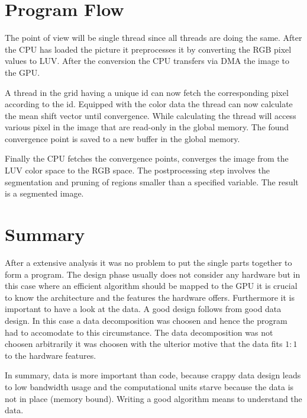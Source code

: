 \section{Program Flow} %
\label{sec:program_flow}

The point of view will be single thread since all threads are doing the same. 
After the \gls{CPU} has loaded the picture it preprocesses it by converting
the \gls{RGB} pixel values to \gls{LUV}. After the conversion the \gls{CPU}
transfers via \gls{DMA} the image to the \gls{GPU}.

A thread in the grid having a unique id can now fetch the corresponding pixel
according to the id. Equipped with the color data the thread can now calculate
the mean shift vector until convergence. While calculating the thread will 
access various pixel in the image that are read-only in the global memory. The 
found convergence point is saved to a new buffer in the global memory.

Finally the \gls{CPU} fetches the convergence points, converges the image from 
the \gls{LUV} color space to the \gls{RGB} space. The postprocessing step
involves the segmentation and pruning of regions smaller than a specified 
variable. The result is a segmented image. 


\section{Summary} %
\label{sec:summary}
After a extensive analysis it was no problem to put the single parts together
to form a program. The design phase usually does not consider any hardware but
in this case where an efficient algorithm should be mapped to the \gls{GPU} it
is crucial to know the architecture and the features the hardware offers. 
Furthermore it is important to have a look at the data. A good design follows
from good data design. In this case a data decomposition was choosen and hence the 
program had to accomodate to this circumstance. The data decomposition was not 
choosen arbitrarily it was choosen with the ulterior motive that the data fits
$1:1$ to the hardware features. 

In summary, data is more important than code, because crappy data design leads
to low bandwidth usage and the computational units starve because the data
is not in place (memory bound). Writing a good algorithm means to understand the 
data. 








